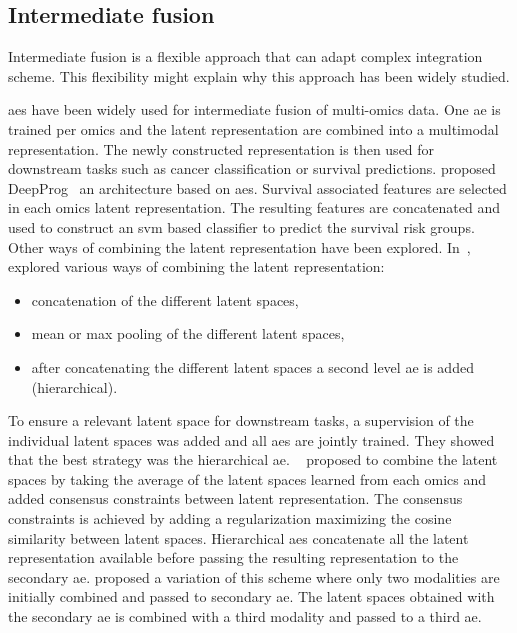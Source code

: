 \documentclass[../main.tex]{subfiles}
\begin{document}
	\subsection{Intermediate fusion}
	    Intermediate fusion is a flexible approach that can adapt complex integration scheme.
	    This flexibility might explain why this approach has been widely studied.

	    \Glspl{ae} have been widely used for intermediate fusion of multi-omics data.
	    One \gls{ae} is trained per omics and the latent representation are combined into a multimodal representation.
	    The newly constructed representation is then used for downstream tasks such as cancer classification or survival predictions.
	    \citeauthor{DeepProg} proposed DeepProg~\cite{DeepProg} an architecture based on \glspl{ae}.
	    Survival associated features are selected in each omics latent representation.
	    The resulting features are concatenated and used to construct an \gls{svm} based classifier to predict the survival risk groups.
	    Other ways of combining the latent representation have been explored.
	    In~\cite{Wissel2021}, \citeauthor{Wissel2021} explored various ways of combining the latent representation:
	    \begin{itemize}[nosep]
	        \item concatenation of the different latent spaces,
	        \item mean or max pooling of the different latent spaces,
	        \item after concatenating the different latent spaces a second level \gls{ae} is added (hierarchical).
	    \end{itemize}
	    To ensure a relevant latent space for downstream tasks, a supervision of the individual latent spaces was added and all \glspl{ae} are jointly trained.
	    They showed that the best strategy was the hierarchical \gls{ae}.
	    \citeauthor{Tong2021}~\cite{Tong2021} proposed to combine the latent spaces by taking the average of the latent spaces learned from each omics and added consensus constraints between latent representation.
	    The consensus constraints is achieved by adding a regularization maximizing the cosine similarity between latent spaces.
	    Hierarchical \glspl{ae} concatenate all the latent representation available before passing the resulting representation to the secondary \gls{ae}.
	    \citeauthor{Wu2022StackedAB} proposed a variation of this scheme where only two modalities are initially combined and passed to secondary \gls{ae}.
	    The latent spaces obtained with the secondary \gls{ae} is combined with a third modality and passed to a third \gls{ae}.
\end{document}
